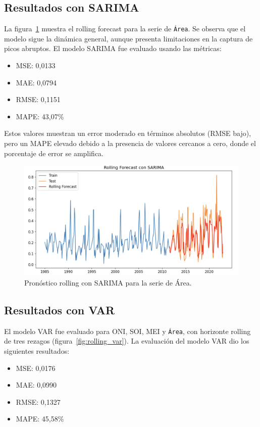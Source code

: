 \subsection{Resultados con SARIMA}

La figura~\ref{fig:rolling_sarima} muestra el rolling forecast para la serie de \texttt{Área}. Se observa que el modelo sigue la dinámica general, aunque presenta limitaciones en la captura de picos abruptos. El modelo SARIMA fue evaluado usando las métricas:

\begin{itemize}
    \item MSE: 0,0133
    \item MAE: 0,0794
    \item RMSE: 0,1151
    \item MAPE: 43,07\%
\end{itemize}

Estos valores muestran un error moderado en términos absolutos (RMSE bajo), pero un MAPE elevado debido a la presencia de valores cercanos a cero, donde el porcentaje de error se amplifica.

\begin{figure}[H]
    \centering
    \includegraphics[scale=0.35]{Figures/rolling_sarima.png}
    \caption{Pronóstico rolling con SARIMA para la serie de Área.}
    \label{fig:rolling_sarima}
\end{figure}

\subsection{Resultados con VAR}

El modelo VAR fue evaluado para ONI, SOI, MEI y \texttt{Área}, con horizonte rolling de tres rezagos (figura~\ref{fig:rolling_var}).
La evaluación del modelo VAR dio los siguientes resultados:
\begin{itemize}
    \item MSE: 0,0176
    \item MAE: 0,0990
    \item RMSE: 0,1327
    \item MAPE: 45,58\%
\end{itemize}

